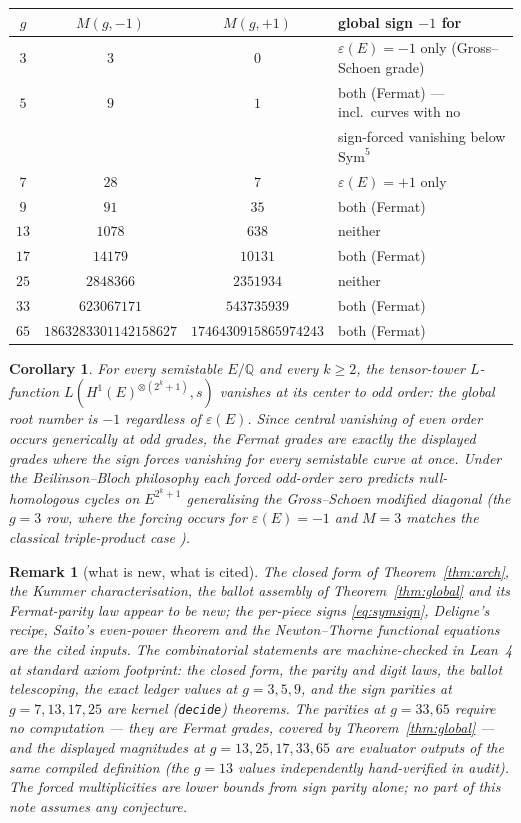 \documentclass[11pt]{article}
\newtheorem{corollary}[theorem]{Corollary}
\newtheorem{remark}[theorem]{Remark}
\newcommand{\Sym}{\mathrm{Sym}}
\newcommand{\eps}{\varepsilon}
\begin{document}
\begin{center}
\begin{tabular}{c|c c|l}
$g$ & $M(g,-1)$ & $M(g,+1)$ & global sign $-1$ for\\ \hline
$3$ & $3$ & $0$ & $\eps(E)=-1$ only (Gross--Schoen grade)\\
$5$ & $9$ & $1$ & both (Fermat) --- incl.\ curves with no\\
& & & \quad sign-forced vanishing below $\Sym^5$\\
$7$ & $28$ & $7$ & $\eps(E)=+1$ only\\
$9$ & $91$ & $35$ & both (Fermat)\\
$13$ & $1078$ & $638$ & neither\\
$17$ & $14179$ & $10131$ & both (Fermat)\\
$25$ & $2848366$ & $2351934$ & neither\\
$33$ & $623067171$ & $543735939$ & both (Fermat)\\
$65$ & $1863283301142158627$ & $1746430915865974243$ & both (Fermat)
\end{tabular}
\end{center}

\begin{corollary}
For every semistable $E/\mathbb Q$ and every $k\ge2$, the tensor-tower
$L$-function $L(H^1(E)^{\otimes(2^k+1)},s)$ vanishes at its center to \emph{odd}
order: the global root number is $-1$ regardless of $\eps(E)$.  Since central
vanishing of even order occurs generically at odd grades, the Fermat grades are
exactly the displayed grades where the sign forces vanishing for every semistable
curve at once.  Under the Beilinson--Bloch philosophy each forced odd-order zero
predicts null-homologous cycles on $E^{2^k+1}$ generalising the Gross--Schoen
modified diagonal (the $g=3$ row, where the forcing occurs for $\eps(E)=-1$ and
$M=3$ matches the classical triple-product case \cite{GrossKudla}).
\end{corollary}

\begin{remark}[what is new, what is cited]
The closed form of Theorem~\ref{thm:arch}, the Kummer characterisation, the ballot
assembly of Theorem~\ref{thm:global} and its Fermat-parity law appear to be new; the
per-piece signs \eqref{eq:symsign}, Deligne's recipe, Saito's even-power theorem and
the Newton--Thorne functional equations are the cited inputs.  The combinatorial
statements are machine-checked in Lean~4 at standard axiom footprint: the closed
form, the parity and digit laws, the ballot telescoping, the exact ledger values at
$g=3,5,9$, and the sign parities at $g=7,13,17,25$ are kernel (\texttt{decide})
theorems.  The parities at $g=33,65$ require no computation --- they are Fermat
grades, covered by Theorem~\ref{thm:global} --- and the displayed magnitudes at
$g=13,25,17,33,65$ are evaluator outputs of the same compiled definition (the
$g=13$ values independently hand-verified in audit).  The forced multiplicities are lower bounds from
sign parity alone; no part of this note assumes any conjecture.
\end{remark}
\end{document}
